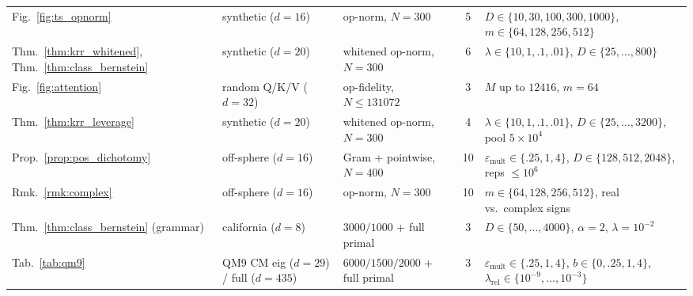 \documentclass{article}
\begin{document}
\begin{table}[h]
{\begin{tabular}{lllcl}
Fig.~\ref{fig:ts_opnorm} & synthetic ($d{=}16$) & op-norm, $N{=}300$ & 5 & $D{\in}\{10,30,100,300,1000\}$, $m{\in}\{64,128,256,512\}$ \\
Thm.~\ref{thm:krr_whitened}, Thm.~\ref{thm:class_bernstein} & synthetic ($d{=}20$) & whitened op-norm, $N{=}300$ & 6 & $\lambda{\in}\{10,1,.1,.01\}$, $D{\in}\{25,\dots,800\}$ \\
Fig.~\ref{fig:attention} & random Q/K/V ($d{=}32$) & op-fidelity, $N{\le}131072$ & 3 & $M$ up to $12416$, $m{=}64$ \\
Thm.~\ref{thm:krr_leverage} & synthetic ($d{=}20$) & whitened op-norm, $N{=}300$ & 4 & $\lambda{\in}\{10,1,.1,.01\}$, $D{\in}\{25,\dots,3200\}$, pool $5{\times}10^4$ \\
Prop.~\ref{prop:pos_dichotomy} & off-sphere ($d{=}16$) & Gram + pointwise, $N{=}400$ & 10 & $\varepsilon_{\mathrm{mult}}{\in}\{.25,1,4\}$, $D{\in}\{128,512,2048\}$, reps $\le10^6$ \\
Rmk.~\ref{rmk:complex} & off-sphere ($d{=}16$) & op-norm, $N{=}300$ & 10 & $m{\in}\{64,128,256,512\}$, real vs.\ complex signs \\
Thm.~\ref{thm:class_bernstein} (grammar) & california ($d{=}8$) & $3000/1000$ + full primal & 3 & $D{\in}\{50,\dots,4000\}$, $\alpha{=}2$, $\lambda{=}10^{-2}$ \\
Tab.~\ref{tab:qm9} & QM9 CM eig ($d{=}29$) / full ($d{=}435$) & $6000/1500/2000$ + full primal & 3 & $\varepsilon_{\mathrm{mult}}{\in}\{.25,1,4\}$, $b{\in}\{0,.25,1,4\}$, $\lambda_{\mathrm{rel}}{\in}\{10^{-9},\dots,10^{-3}\}$ \\
\bottomrule
\end{tabular}}
\end{table}
\end{document}
